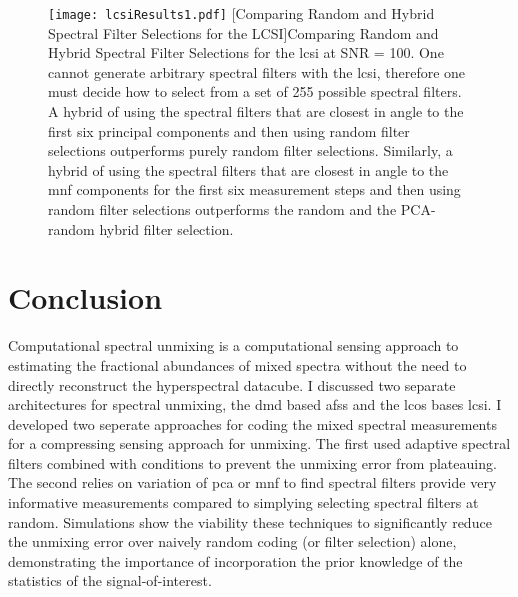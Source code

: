 \begin{figure}[H]
	\centering
	\texttt{[image: lcsiResults1.pdf]}
	[Comparing Random and Hybrid Spectral Filter Selections for the LCSI]{Comparing Random and Hybrid Spectral Filter Selections for the \gls{lcsi} at SNR = 100. One cannot generate arbitrary spectral filters with the \gls{lcsi}, therefore one must decide how to select from a set of 255 possible spectral filters. A hybrid of using the spectral filters that are closest in angle to the first six principal components and then using random filter selections outperforms purely random filter selections. Similarly, a hybrid of using the spectral filters that are closest in angle to the \gls{mnf} components for the first six measurement steps and then using random filter selections outperforms the random and the PCA-random hybrid filter selection. }
	\label{fig:lcsiResults1}
\end{figure}

\section{Conclusion}

Computational spectral unmixing is a computational sensing approach to estimating the fractional abundances of mixed spectra without the need to directly reconstruct the hyperspectral datacube. I discussed two separate architectures for spectral unmixing, the \gls{dmd} based \gls{afss} and the \gls{lcos} bases \gls{lcsi}. I developed two seperate approaches for coding the mixed spectral measurements for a compressing sensing approach for unmixing. The first used adaptive spectral filters combined with conditions to prevent the unmixing error from plateauing. The second relies on variation of \acrfull{pca} or \acrfull{mnf} to find spectral filters provide very informative measurements compared to simplying selecting spectral filters at random. Simulations show the viability these techniques to significantly reduce the unmixing error over naively random coding (or filter selection) alone, demonstrating the importance of incorporation the prior knowledge of the statistics of the signal-of-interest. 